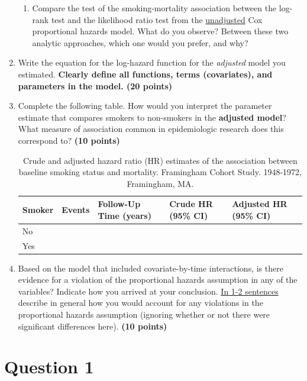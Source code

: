 \documentclass{article}\usepackage[]{graphicx}\usepackage[]{color}
\begin{document}
\begin{enumerate}
\begin{enumerate}
    \item Compare the test of the smoking-mortality association between the log-rank test and the likelihood ratio test from the \ul{unadjusted} Cox proportional hazards model. What do you observe? Between these two analytic approaches, which one would you prefer, and why?
  \end{enumerate}
  \item Write the equation for the log-hazard function for the \textit{adjusted} model you estimated. \textbf{Clearly define all functions, terms (covariates), and parameters in the model. (20 points)}
  \item Complete the following table. How would you interpret the parameter estimate that compares smokers to non-smokers in the \textbf{adjusted model}? What measure of association common in epidemiologic research does this correspond to? \textbf{(10 points)}




\begin{table}[H]
\centering
\parbox{10cm}{\caption{Crude and adjusted hazard ratio (HR) estimates of the association between baseline smoking status and mortality. Framingham Cohort Study. 1948-1972, Framingham, MA.}} 
\begin{tabular}{lllll}
  \hline
Smoker & Events & Follow-Up Time (years) & Crude HR (95\% CI) & Adjusted HR (95\% CI) \\ 
  \hline
No &  &  &  &  \\ 
  Yes &  &  &  &  \\ 
   \hline
\end{tabular}
\end{table}

  
  \item Based on the model that included covariate-by-time interactions, is there evidence for a violation of the proportional hazards assumption in any of the variables? Indicate how you arrived at your conclusion. \ul{In 1-2 sentences} describe in general how you would account for any violations in the proportional hazards assumption (ignoring whether or not there were significant differences here). \textbf{(10 points)}
\end{enumerate}

\pagebreak

\section*{Question 1}
\end{document}
